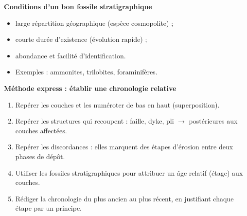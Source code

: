 \documentclass[11pt]{article}
\begin{document}
\begin{bilan}
\textbf{Conditions d'un bon fossile stratigraphique}
\begin{itemize}
  \item large répartition géographique (espèce cosmopolite) ;
  \item courte durée d'existence (évolution rapide) ;
  \item abondance et facilité d'identification.
  \item Exemples : ammonites, trilobites, foraminifères.
\end{itemize}

\textbf{Méthode express : établir une chronologie relative}
\begin{enumerate}
  \item Repérer les couches et les numéroter de bas en haut (superposition).
  \item Repérer les structures qui recoupent : faille, dyke, pli $\rightarrow$ postérieures aux couches affectées.
  \item Repérer les discordances : elles marquent des étapes d'érosion entre deux phases de dépôt.
  \item Utiliser les fossiles stratigraphiques pour attribuer un âge relatif (étage) aux couches.
  \item Rédiger la chronologie du plus ancien au plus récent, en justifiant chaque étape par un principe.
\end{enumerate}
\end{bilan}
\end{document}
